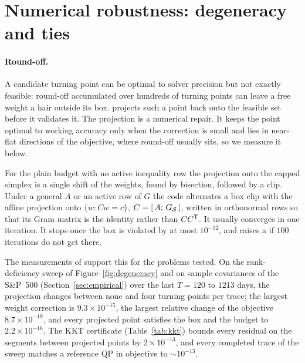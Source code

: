 \section{Numerical robustness: degeneracy and ties}
\label{sec:degeneracy}

\paragraph{Round-off.}
A candidate turning point can be optimal to solver precision but not exactly feasible:
round-off accumulated over hundreds of turning points can leave a free weight a hair
outside its box.  projects such a point back onto the feasible set
before it validates it. The projection is a numerical repair. It keeps the point optimal
to working accuracy only when the correction is small and lies in near-flat directions
of the objective, where round-off usually sits, so we measure it below.

For the plain budget with no active inequality row the projection onto the capped
simplex is a single shift of the weights, found by bisection, followed by a clip.
Under a general $A$ or an active row of $G$ the code alternates a box clip with the
affine projection onto $\{w : C w = c\}$, $C = [\,A;\,G_{\mathcal{S}}\,]$, written in
orthonormal rows so that its Gram matrix is the identity rather than $CC^{\mathsf{T}}$. It
usually converges in one iteration. It stops once the box is violated by at most
$10^{-12}$, and raises a  if $100$ iterations do not get there.

The measurements of  support this for the problems tested.
On the rank-deficiency sweep of Figure~\ref{fig:degeneracy} and on sample covariances of
the S\&P~500 (Section~\ref{sec:empirical}) over the last $T = 120$ to $1213$ days, the projection changes between none and four turning points per
trace; the largest weight correction is $9.3\times10^{-15}$, the largest relative change
of the objective $8.7\times10^{-19}$, and every projected point satisfies the box and the
budget to $2.2\times10^{-16}$. The KKT certificate (Table~\ref{tab:kkt}) bounds every
residual on the segments between projected points by $2\times10^{-13}$, and every
completed trace of the sweep matches a reference QP in objective to $\sim\!10^{-13}$.

